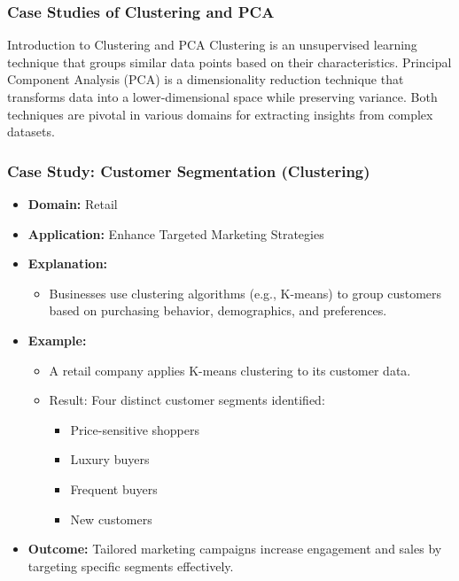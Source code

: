 \documentclass[aspectratio=169]{beamer}
\begin{document}
\begin{frame}[fragile]
    \frametitle{Case Studies of Clustering and PCA}
    \begin{block}{Introduction to Clustering and PCA}
        Clustering is an unsupervised learning technique that groups similar data points based on their characteristics. 
        Principal Component Analysis (PCA) is a dimensionality reduction technique that transforms data into a lower-dimensional space while preserving variance. 
        Both techniques are pivotal in various domains for extracting insights from complex datasets.
    \end{block}
\end{frame}

\begin{frame}[fragile]
    \frametitle{Case Study: Customer Segmentation (Clustering)}
    \begin{itemize}
        \item \textbf{Domain:} Retail
        \item \textbf{Application:} Enhance Targeted Marketing Strategies
        \item \textbf{Explanation:}
            \begin{itemize}
                \item Businesses use clustering algorithms (e.g., K-means) to group customers based on purchasing behavior, demographics, and preferences.
            \end{itemize}
        \item \textbf{Example:}
            \begin{itemize}
                \item A retail company applies K-means clustering to its customer data.
                \item Result: Four distinct customer segments identified:
                        \begin{itemize}
                            \item Price-sensitive shoppers
                            \item Luxury buyers
                            \item Frequent buyers
                            \item New customers
                        \end{itemize}
            \end{itemize}
        \item \textbf{Outcome:} Tailored marketing campaigns increase engagement and sales by targeting specific segments effectively.
    \end{itemize}
\end{frame}
\end{document}
